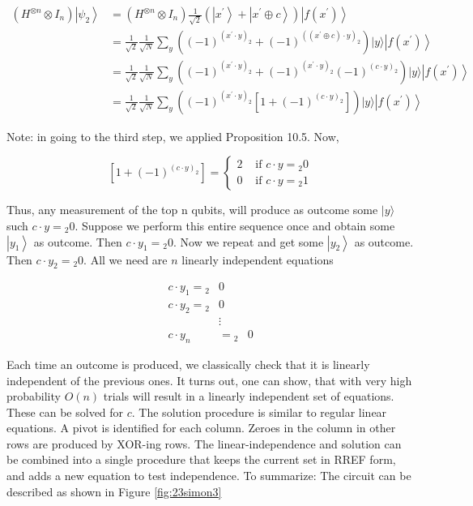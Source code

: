 \documentclass[main.tex]{subfiles}
\begin{document}
    $$
    \begin{aligned}
    \left(H^{\otimes n} \otimes I_{n}\right)\left|\psi_{2}\right\rangle &=\left(H^{\otimes n} \otimes I_{n}\right) \frac{1}{\sqrt{2}}\left(\left|x^{\prime}\right\rangle+\left|x^{\prime} \oplus c\right\rangle\right)\left|f\left(x^{\prime}\right)\right\rangle \\
    &=\frac{1}{\sqrt{2}} \frac{1}{\sqrt{N}} \sum_{y}\left((-1)^{\left(x^{\prime} \cdot y\right)_{2}}+(-1)^{\left(\left(x^{\prime} \oplus c\right) \cdot y\right)_{2}}\right)|y\rangle\left|f\left(x^{\prime}\right)\right\rangle \\
    &=\frac{1}{\sqrt{2}} \frac{1}{\sqrt{N}} \sum_{y}\left((-1)^{\left(x^{\prime} \cdot y\right)_{2}}+(-1)^{\left(x^{\prime} \cdot y\right)_{2}}(-1)^{(c \cdot y)_{2}}\right)|y\rangle\left|f\left(x^{\prime}\right)\right\rangle \\
    &=\frac{1}{\sqrt{2}} \frac{1}{\sqrt{N}} \sum_{y}\left((-1)^{\left(x^{\prime} \cdot y\right)_{2}}\left[1+(-1)^{(c \cdot y)_{2}}\right]\right)|y\rangle\left|f\left(x^{\prime}\right)\right\rangle
    \end{aligned}
    $$
    
    Note: in going to the third step, we applied Proposition 10.5. Now,
    
    $$
    \left[1+(-1)^{(c \cdot y)_{2}}\right]= \begin{cases}2 & \text { if } c \cdot y={ }_{2} 0 \\ 0 & \text { if } c \cdot y={ }_{2} 1\end{cases}
    $$
    
    Thus, any measurement of the top $\mathrm{n}$ qubits, will produce as outcome some $|y\rangle$ such $c \cdot y={ }_{2} 0$. Suppose we perform this entire sequence once and obtain some $\left|y_{1}\right\rangle$ as outcome. Then $c \cdot y_{1}={ }_{2} 0$. Now we repeat and get some $\left|y_{2}\right\rangle$ as outcome. Then $c \cdot y_{2}={ }_{2} 0$. All we need are $n$ linearly independent equations
    
    $$
    \begin{array}{ccc}
    c \cdot y_{1}={ }_{2} & 0 \\
    c \cdot y_{2}={ }_{2} & 0 \\
    & \vdots & \\
    c \cdot y_{n} & ={ }_{2} & 0
    \end{array}
    $$
    
    Each time an outcome is produced, we classically check that it is linearly independent of the previous ones. It turns out, one can show, that with very high probability $O(n)$ trials will result in a linearly independent set of equations. These can be solved for $c$. The solution procedure is similar to regular linear equations. A pivot is identified for each column. Zeroes in the column in other rows are produced by XOR-ing rows. The linear-independence and solution can be combined into a single procedure that keeps the current set in RREF form, and adds a new equation to test independence. To summarize: The circuit can be described as shown in Figure \ref{fig:23simon3}
    
\end{document}

